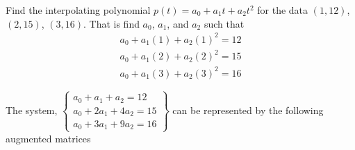 \documentclass{../mathhomework}
\begin{document}
\begin{problem}[1.2\#33]
    Find the interpolating polynomial $p(t) = a_0 + a_1t + a_2t^2$ for the data $(1,12)$, $(2,15)$, $(3,16)$. That is find $a_0$, $a_1$, and $a_2$ such that
    \begin{align*}
        a_0 + a_1(1) + a_2(1)^2 = 12 \\
        a_0 + a_1(2) + a_2(2)^2 = 15 \\
        a_0 + a_1(3) + a_2(3)^2 = 16
    \end{align*}

    \begin{solution}
        The system, $\begin{Bmatrix}
            a_0 + a_1 + a_2 = 12 \\
            a_0 + 2a_1 + 4a_2 = 15 \\
            a_0 + 3a_1 + 9a_2 = 16
        \end{Bmatrix}$ can be represented by the following augmented matrices
    

\end{solution}
\end{problem}
\end{document}

